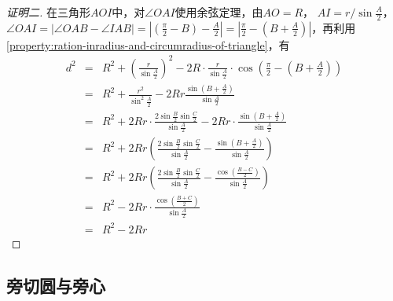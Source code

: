 \begin{proof}[证明二]
  在三角形$AOI$中，对$\angle OAI$使用余弦定理，由$AO=R$， $AI=r/\sin{\frac{A}{2}}$，$\angle OAI = \left| \angle OAB - \angle IAB \right| = \left| \left( \frac{\pi}{2}-B \right) - \frac{A}{2} \right| = \left| \frac{\pi}{2} - \left( B+\frac{A}{2} \right) \right|$，再利用\autoref{property:ration-inradius-and-circumradius-of-triangle}，有
  \begin{eqnarray*}
    d^2 & = & R^2+\left( \frac{r}{\sin{\frac{A}{2}}} \right)^2 - 2R \cdot \frac{r}{\sin{\frac{A}{2}}} \cdot \cos{\left( \frac{\pi}{2}-\left( B+\frac{A}{2} \right) \right)} \\
        & = & R^2 + \frac{r^2}{\sin^2 \frac{A}{2}} -2Rr \frac{\sin{\left( B+\frac{A}{2} \right)}}{\sin{\frac{A}{2}}} \\
    & = & R^2 + 2Rr \cdot \frac{2\sin{\frac{B}{2}}\sin{\frac{C}{2}}}{\sin{\frac{A}{2}}}-2Rr \cdot \frac{\sin{\left( B+\frac{A}{2} \right)}}{\sin{\frac{A}{2}}} \\
        & = & R^2 + 2Rr \left( \frac{2\sin{\frac{B}{2}}\sin{\frac{C}{2}}}{\sin{\frac{A}{2}}} - \frac{\sin{\left( B+\frac{A}{2} \right)}}{\sin{\frac{A}{2}}} \right) \\
        & = & R^2 + 2Rr \left( \frac{2\sin{\frac{B}{2}}\sin{\frac{C}{2}}}{\sin{\frac{A}{2}}} - \frac{\cos{\left( \frac{B-C}{2} \right)}}{\sin{\frac{A}{2}}} \right) \\
        & = & R^2 - 2Rr \cdot \frac{\cos{\left( \frac{B+C}{2} \right)}}{\sin{\frac{A}{2}}} \\
    & = & R^2 - 2Rr
  \end{eqnarray*}
\end{proof}

\subsection{旁切圆与旁心}
\label{sec:escenter}



